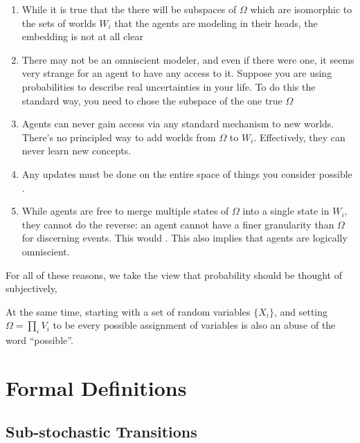 \documentclass{article}
\begin{document}
	
	\begin{enumerate}
		\item While it is true that the there will be subspaces of $\Omega$ which are isomorphic to the sets of worlds $W_i$ that the agents are modeling in their heads, the embedding is not at all clear \todo{}
		
		\item There may not be an omniscient modeler, and even if there were one, it seems very strange for an agent to have any access to it. Suppose you are using probabilities to describe real uncertainties in your life. To do this the standard way, you need to chose the subspace of the one true $\Omega$ 
		
		\item Agents can never gain access via any standard mechanism to new worlds. There's no principled way to add worlds from $\Omega$ to $W_i$. Effectively, they can never learn new concepts.
		
		\item Any updates must be done on the entire space of things you consider possible .
		
		\item While agents are free to merge multiple states of $\Omega$ into a single state in $W_i$, they cannot do the reverse: an agent cannot have a finer granularity than $\Omega$ for discerning events. This would . This also implies that agents are logically omniscient.
	\end{enumerate}

	For all of these reasons, we take the view that probability should be thought of subjectively, 
	
	
	At the same time, starting with a set of random variables $\{X_i\}$, and setting $\Omega = \prod_{i} V_i$ to be every possible assignment of variables is also an abuse of the word ``possible''.
	
	
	\section{Formal Definitions}
	
	\subsection{Sub-stochastic Transitions}
	
\end{document}
